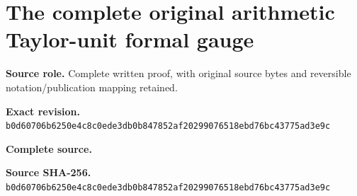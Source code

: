 \begingroup
\sloppy
\small
\section{The complete original arithmetic Taylor-unit formal gauge}
\noindent\textbf{Source role.} Complete written proof, with original source bytes and reversible notation/publication mapping retained.\par
\noindent\textbf{Exact revision.} \nolinkurl{b0d60706b6250e4c8c0ede3db0b847852af20299076518ebd76bc43775ad3e9c}\par
\noindent\textbf{Complete source.} \par
\noindent\textbf{Source SHA-256.} \nolinkurl{b0d60706b6250e4c8c0ede3db0b847852af20299076518ebd76bc43775ad3e9c}\par\medskip

\endgroup
